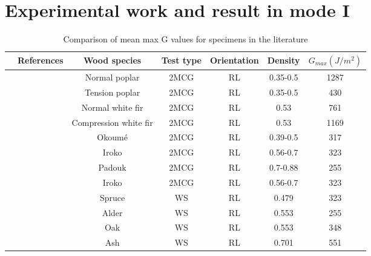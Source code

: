 \chapter{Experimental work and result in mode I}
\label{Chapter3}


\begin{table} \centering
	\begin{tabular}{ccccccc}
		\toprule %
		& References & Wood species & Test type & Orientation & Density & $G_{max}(J/m^2)$\\\midrule
		& \cite{Mambili2018} & Normal poplar & 2MCG & RL & 0.35-0.5 & 1287\\\midrule
		& \cite{Mambili2018} & Tension poplar & 2MCG & RL & 0.35-0.5 & 430\\\midrule
		& \cite{Mambili2018} & Normal white fir & 2MCG & RL & 0.53 & 761\\\midrule
		& \cite{Mambili2018} & Compression white fir & 2MCG & RL  & 0.53 & 1169\\\midrule
		& \cite{Odounga2018phd} & Okoumé & 2MCG & RL & 0.39-0.5 & 317\\\midrule
		& \cite{Odounga2018phd} & Iroko & 2MCG & RL & 0.56-0.7 & 323\\\midrule
		& \cite{Odounga2018phd} & Padouk & 2MCG & RL & 0.7-0.88 & 255\\\midrule
		& \cite{Odounga2018phd} & Iroko & 2MCG & RL & 0.56-0.7 & 323\\\midrule
		& \cite{Reiterer2002} & Spruce & WS & RL & 0.479 & 323\\\midrule
		& \cite{Reiterer2002} & Alder & WS & RL & 0.553 & 255\\\midrule
		& \cite{Reiterer2002} & Oak & WS & RL & 0.553 & 348\\\midrule
		& \cite{Reiterer2002} & Ash & WS & RL & 0.701 & 551\\
		\bottomrule %
	\end{tabular}
	\caption{Comparison of mean max G values for specimens in the literature}
	\label{fig:fig13}
\end{table}
